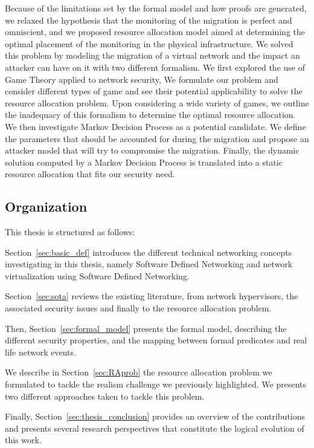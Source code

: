 Because of the limitations set by the formal model and how proofs are generated, we relaxed the hypothesis that the monitoring of the migration is perfect and omniscient, and we proposed resource allocation model aimed at determining the optimal placement of the monitoring in the physical infrastructure. We solved this problem by modeling the migration of a virtual network and the impact an attacker can have on it with two different formalism. We first explored the use of Game Theory applied to network security, We formulate our problem and consider different types of game and see their potential applicability to solve the resource allocation problem. Upon considering a wide variety of games, we outline the inadequacy of this formalism to determine the optimal resource allocation.
We then investigate Markov Decision Process as a potential candidate. We define the parameters that should be accounted for during the migration and propose an attacker model that will try to compromise the migration. Finally, the dynamic solution computed by a Markov Decision Process is translated into a static resource allocation that fits our security need.

\subsection{Organization}
This thesis is structured as follows: 

Section~\ref{sec:basic_def} introduces the different technical networking concepts investigating in this thesis, namely Software Defined Networking and network virtualization using Software Defined Networking. 

Section~\ref{sec:sota} reviews the existing literature, from network hypervisors, the associated security issues and finally to the resource allocation problem. 

Then, Section~\ref{sec:formal_model} presents the formal model, describing the different security properties, and the mapping between formal predicates and real life network events.

We describe in Section~\ref{sec:RAprob} the resource allocation problem we formulated to tackle the realism challenge we previously highlighted.
We presents two different approaches taken to tackle this problem.

Finally, Section~\ref{sec:thesis_conclusion} provides an overview of the contributions and presents several research perspectives that constitute the logical evolution of this work. 
